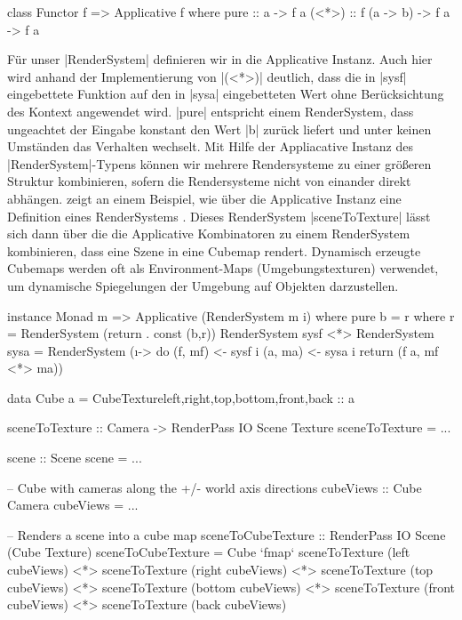 \begin{haskell}[label={lst:class-functor},caption={Applicative Klasse\protect\footnotemark},nolol]
class Functor f => Applicative f where
  pure :: a -> f a
  (<*>) :: f (a -> b) -> f a -> f a
\end{haskell}

Für unser |RenderSystem| definieren wir in  die Applicative Instanz. Auch hier wird anhand der Implementierung von |(<*>)| deutlich, dass die in |sysf| eingebettete Funktion auf den in |sysa| eingebetteten Wert ohne Berücksichtung des Kontext angewendet wird. |pure| entspricht einem RenderSystem, dass ungeachtet der Eingabe konstant den Wert |b| zurück liefert und unter keinen Umständen das Verhalten wechselt. Mit Hilfe der Appliacative Instanz des |RenderSystem|-Typens können wir mehrere Rendersysteme zu einer größeren Struktur kombinieren, sofern die Rendersysteme nicht von einander direkt abhängen.  zeigt an einem Beispiel, wie über die Applicative Instanz eine Definition eines RenderSystems . Dieses RenderSystem |sceneToTexture| lässt sich dann über die die Applicative Kombinatoren zu einem RenderSystem kombinieren, dass eine Szene in eine Cubemap rendert. Dynamisch erzeugte Cubemaps werden oft als Environment-Maps (Umgebungstexturen) verwendet, um dynamische Spiegelungen der Umgebung auf Objekten darzustellen.

\begin{haskell}[label={lst:rendersystem-applicative},caption={Applicative Instanz für RenderSystem}]
instance Monad m => Applicative (RenderSystem m i) where
  pure b = r where r = RenderSystem (return . const (b,r))
  RenderSystem sysf <*> RenderSystem sysa = RenderSystem (\i -> do
    (f, mf) <- sysf i
    (a, ma) <- sysa i
    return (f a, mf <*> ma))
\end{haskell}

\begin{haskell}[label={lst:rendersystem-applicative-beispiel},caption={Applicative RenderSystem Beispiel}]
data Cube a = CubeTexture{left,right,top,bottom,front,back :: a}

sceneToTexture :: Camera -> RenderPass IO Scene Texture
sceneToTexture = ...

scene :: Scene
scene = ...

-- Cube with cameras along the +/- world axis directions
cubeViews :: Cube Camera
cubeViews = ...

-- Renders a scene into a cube map
sceneToCubeTexture :: RenderPass IO Scene (Cube Texture)
sceneToCubeTexture = Cube
	`fmap` sceneToTexture (left cubeViews)
	<*> sceneToTexture (right  cubeViews)
	<*> sceneToTexture (top    cubeViews)
	<*> sceneToTexture (bottom cubeViews)
	<*> sceneToTexture (front  cubeViews)
	<*> sceneToTexture (back   cubeViews)
\end{haskell}


